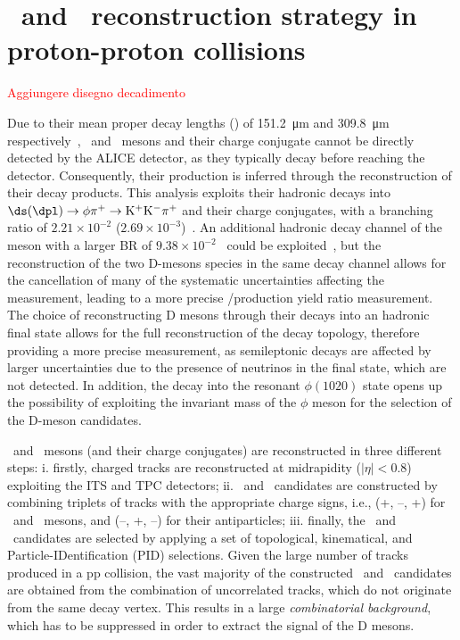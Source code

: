 \chapter{\texorpdfstring{\dpl\ and \ds\ reconstruction strategy in proton-proton collisions}{D+ and Ds+ reconstruction strategy in proton-proton collisions}}\label{chap:reconstruction}

\textcolor{red}{Aggiungere disegno decadimento}

Due to their mean proper decay lengths (\ct) of \SI{151.2}{\micro\meter} and \SI{309.8}{\micro\meter} respectively~\cite{pdg}, \ds\ and \dpl\ mesons and their charge conjugate cannot be directly detected by the ALICE detector, as they typically decay before reaching the detector. Consequently, their production is inferred through the reconstruction of their decay products. This analysis exploits their hadronic decays into $\ds (\dpl) \rightarrow \mathrm{\phi\pi^+ \rightarrow K^+K^-\pi^+}$ and their charge conjugates, with a branching ratio of $2.21\times10^{-2}$ ($2.69\times10^{-3}$)~\cite{pdg}. An additional hadronic decay channel of the \dpl meson with a larger BR of $9.38\times10^{-2}$~\cite{pdg} could be exploited~\cite{ALICE:2017olh}, but the reconstruction of the two D-mesons species in the same decay channel allows for the cancellation of many of the systematic uncertainties affecting the measurement, leading to a more precise \ds/\dpl production yield ratio measurement. The choice of reconstructing D mesons through their decays into an hadronic final state allows for the full reconstruction of the decay topology, therefore providing a more precise measurement, as semileptonic decays are affected by larger uncertainties due to the presence of neutrinos in the final state, which are not detected. In addition, the decay into the resonant $\phi(1020)$ state opens up the possibility of exploiting the invariant mass of the $\phi$ meson for the selection of the D-meson candidates.

\ds\ and \dpl\ mesons (and their charge conjugates) are reconstructed in three different steps: i. firstly, charged tracks are reconstructed at midrapidity ($\lvert\eta\rvert < 0.8$) exploiting the ITS and TPC detectors; ii. \ds\ and \dpl\ candidates are constructed by combining triplets of tracks with the appropriate charge signs, i.e., (+, --, +) for \ds\ and \dpl\ mesons, and (--, +, --) for their antiparticles; iii. finally, the \ds\ and \dpl\ candidates are selected by applying a set of topological, kinematical, and Particle-IDentification (PID)  selections. Given the large number of tracks produced in a pp collision, the vast majority of the constructed \ds\ and \dpl\ candidates are obtained from the combination of uncorrelated tracks, which do not originate from the same decay vertex. This results in a large \emph{combinatorial background}, which has to be suppressed in order to extract the signal of the D mesons. 

